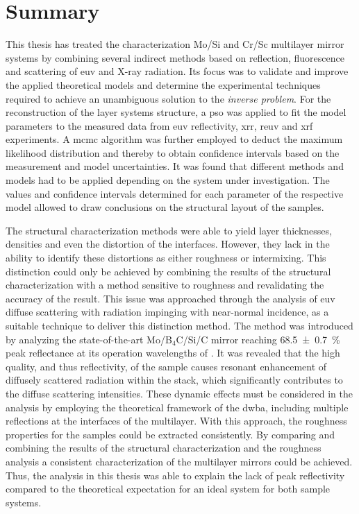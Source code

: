 \glsresetall
\chapter{Summary} \label{ch_summary}
This thesis has treated the characterization Mo/Si and Cr/Sc multilayer mirror
systems by combining several indirect methods based on reflection, fluorescence
and scattering of \gls{euv} and X-ray radiation.
Its focus was to validate and improve the applied theoretical models and
determine the experimental techniques required to achieve an unambiguous
solution to the \emph{inverse problem}.
For the reconstruction of the layer systems structure, a \gls{pso} was applied
to fit the model parameters to the measured data from \gls{euv} reflectivity,
\gls{xrr}, \gls{reuv} and \gls{xrf} experiments.
A \gls{mcmc} algorithm was further employed to deduct the maximum likelihood
distribution and thereby to obtain confidence intervals based on the measurement
and model uncertainties.
It was found that different methods and models had to be applied depending on
the system under investigation.
The values and confidence intervals determined for each parameter of the
respective model allowed to draw conclusions on the structural layout of the
samples.

The structural characterization methods were able to yield layer thicknesses,
densities and even the distortion of the interfaces.
However, they lack in the ability to identify these distortions as either
roughness or intermixing.
This distinction could only be achieved by combining the results of the
structural characterization with a method sensitive to roughness and
revalidating the accuracy of the result.
This issue was approached through the analysis of \gls{euv} diffuse scattering
with radiation impinging with near-normal incidence, as a suitable technique to
deliver this distinction method.
The method was introduced by analyzing the state-of-the-art Mo/B$_4$C/Si/C
mirror reaching \SI{68.5 \pm 0.7}{\percent} peak reflectance at its operation
wavelengths of .
It was revealed that the high quality, and thus reflectivity, of the sample
causes resonant enhancement of diffusely scattered radiation within the stack,
which significantly contributes to the diffuse scattering intensities.
These dynamic effects must be considered in the analysis by employing the
theoretical framework of the \gls{dwba}, including multiple reflections at the
interfaces of the multilayer.
With this approach, the roughness properties for the samples could be extracted
consistently.
By comparing and combining the results of the structural characterization and
the roughness analysis a consistent characterization of the multilayer mirrors
could be achieved.
Thus, the analysis in this thesis was able to explain the lack of peak
reflectivity compared to the theoretical expectation for an ideal system for
both sample systems.

